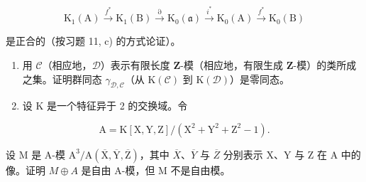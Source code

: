 \[
\mathrm{K} _ {1} (\mathrm{A}) \xrightarrow {f ^ {*}} \mathrm{K} _ {1} (\mathrm{B}) \xrightarrow {\partial} \mathrm{K} _ {0} (\mathfrak {a}) \xrightarrow {i ^ {*}} \mathrm{K} _ {0} (\mathrm{A}) \xrightarrow {f ^ {*}} \mathrm{K} _ {0} (\mathrm{B})
\]

是正合的（按习题 11, c) 的方式论证）。

\begin{enumerate}
\def\labelenumi{\arabic{enumi})}
\setcounter{enumi}{12}
\item
  用 \(\mathcal{C}\)（相应地，\(\mathcal{D}\)）表示有限长度 \(\mathbf{Z}\)-模（相应地，有限生成 \(\mathbf{Z}\)-模）的类所成之集。证明群同态 \(\gamma_{\mathcal{D},\mathcal{C}}\)（从 \(\mathrm{K}(\mathcal{C})\) 到 \(\mathrm{K}(\mathcal{D})\)）是零同态。
\item
  设 K 是一个特征异于 2 的交换域。令
\end{enumerate}

\[
\mathrm{A} = \mathrm{K} [ \mathrm{X}, \mathrm{Y}, \mathrm{Z} ] / (\mathrm{X} ^ {2} + \mathrm{Y} ^ {2} + \mathrm{Z} ^ {2} - 1).
\]

设 M 是 A-模 \(\mathrm{A}^{3}/\mathrm{A}(\overline{\mathrm{X}},\overline{\mathrm{Y}},\overline{\mathrm{Z}})\)，其中 \(\overline{X}\)、\(\overline{Y}\) 与 \(\overline{Z}\) 分别表示 X、Y 与 Z 在 A 中的像。证明 \(M\oplus A\) 是自由 A-模，但 M 不是自由模。

